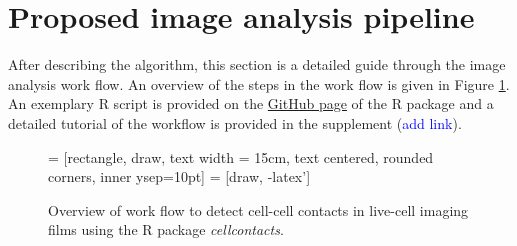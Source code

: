 \documentclass{report}
\begin{document}
\section{Proposed image analysis pipeline}

After describing the algorithm, this section is a detailed guide through the image analysis work flow. An overview of the steps in the work flow is given in Figure \ref{Workflow_overview}. An exemplary R script is provided on the \href{https://github.com/juliaquach02/cellcontacts}{GitHub page} of the R package and a detailed tutorial of the workflow is provided in the supplement (\textcolor{blue}{add link}).
\begin{figure}
\caption[Workflow_Overview]{Overview of work flow to detect cell-cell contacts in live-cell imaging films using the R package \textit{cellcontacts}. \label{Workflow_overview}}
\centering
{} = [rectangle, draw,
    text width = 15cm, text centered, rounded corners, inner ysep=10pt]
 = [draw, -latex']


\end{figure}
\end{document}
